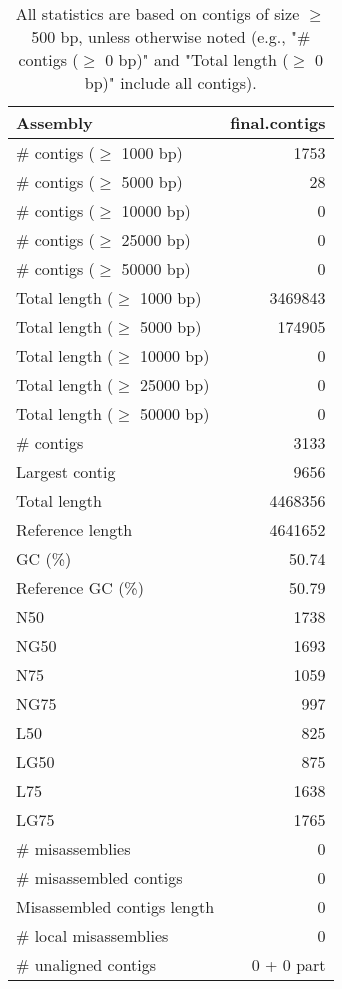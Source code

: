 \documentclass[12pt,a4paper]{article}
\begin{document}
\begin{table}[ht]
\begin{center}
\caption{All statistics are based on contigs of size $\geq$ 500 bp, unless otherwise noted (e.g., "\# contigs ($\geq$ 0 bp)" and "Total length ($\geq$ 0 bp)" include all contigs).}
\begin{tabular}{|l*{1}{|r}|}
\hline
Assembly & final.contigs \\ \hline
\# contigs ($\geq$ 1000 bp) & 1753 \\ \hline
\# contigs ($\geq$ 5000 bp) & 28 \\ \hline
\# contigs ($\geq$ 10000 bp) & 0 \\ \hline
\# contigs ($\geq$ 25000 bp) & 0 \\ \hline
\# contigs ($\geq$ 50000 bp) & 0 \\ \hline
Total length ($\geq$ 1000 bp) & 3469843 \\ \hline
Total length ($\geq$ 5000 bp) & 174905 \\ \hline
Total length ($\geq$ 10000 bp) & 0 \\ \hline
Total length ($\geq$ 25000 bp) & 0 \\ \hline
Total length ($\geq$ 50000 bp) & 0 \\ \hline
\# contigs & 3133 \\ \hline
Largest contig & 9656 \\ \hline
Total length & 4468356 \\ \hline
Reference length & 4641652 \\ \hline
GC (\%) & 50.74 \\ \hline
Reference GC (\%) & 50.79 \\ \hline
N50 & 1738 \\ \hline
NG50 & 1693 \\ \hline
N75 & 1059 \\ \hline
NG75 & 997 \\ \hline
L50 & 825 \\ \hline
LG50 & 875 \\ \hline
L75 & 1638 \\ \hline
LG75 & 1765 \\ \hline
\# misassemblies & 0 \\ \hline
\# misassembled contigs & 0 \\ \hline
Misassembled contigs length & 0 \\ \hline
\# local misassemblies & 0 \\ \hline
\# unaligned contigs & 0 + 0 part \\ \hline

\end{tabular}
\end{center}
\end{table}
\end{document}
